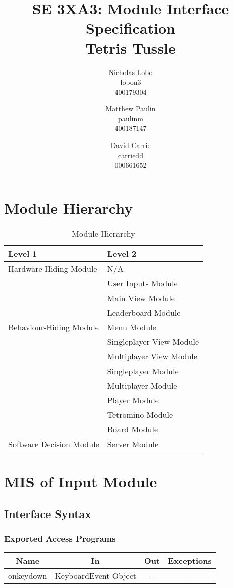 \documentclass[12,english]{article}
\title{SE 3XA3: Module Interface Specification\\Tetris Tussle}
\author{Nicholas Lobo \\ lobon3 \\ 400179304 \and
	Matthew Paulin \\ paulinm \\ 400187147 \and
	David Carrie \\ carriedd \\ 000661652 \and
}
\date{}
\begin{document}
\maketitle
\newpage
\tableofcontents
\listoftables
\newpage

\section{Module Hierarchy}
\begin{table}[H]
\centering
\begin{tabular}{p{} p{}}
\toprule
\textbf{Level 1} & \textbf{Level 2}\\
\midrule

{Hardware-Hiding Module}& N/A\\
\midrule

\multirow{7}{0.3\textwidth}{Behaviour-Hiding Module} 
& User Inputs Module\\
& Main View Module\\
& Leaderboard Module\\
& Menu Module\\
& Singleplayer View Module\\
& Multiplayer View Module\\
& Singleplayer Module\\
& Multiplayer Module\\
& Player Module\\
& Tetromino Module\\
& Board Module\\

\midrule

Software Decision Module & Server Module\\ 

\bottomrule

\end{tabular}
\caption{Module Hierarchy}
\label{TblMH}
\end{table}

\section{MIS of Input Module}
		\subsection{Interface Syntax}
		\subsubsection{Exported Access Programs}
		\begin{tabular}[pos]{|c|c|c|c|}
			\hline
		\label{InputEAP}
			\textbf{Name}& \textbf{In} & \textbf{Out} & \textbf{Exceptions} \\ \hline
			onkeydown & KeyboardEvent Object & - & -\\ \hline
			
		\end{tabular}
		
\end{document}
